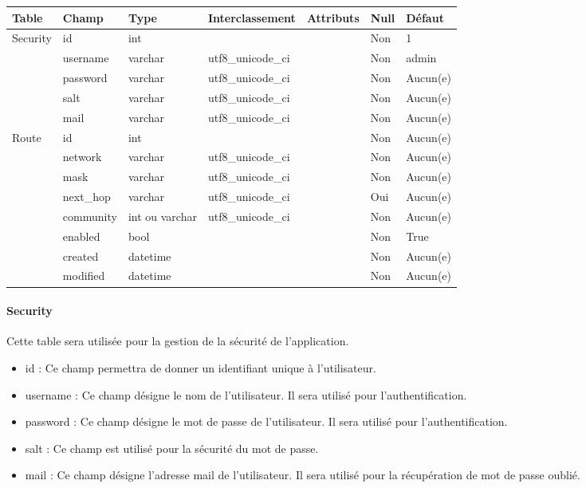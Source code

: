\begin{tabular}{|l|l|l|l|l|l|l|}
   \hline
    Table & Champ & Type & Interclassement & Attributs & Null & Défaut \\
    \hline
        Security & id & int &  &  & Non & 1 \\
    \cline{2-7}
         & username & varchar & utf8\_unicode\_ci & & Non & admin \\
    \cline{2-7}
         & password & varchar & utf8\_unicode\_ci & & Non & Aucun(e) \\
    \cline{2-7}
         & salt & varchar & utf8\_unicode\_ci & & Non & Aucun(e) \\
    \cline{2-7}
         & mail & varchar & utf8\_unicode\_ci & & Non & Aucun(e) \\
    \hline
        Route & id & int &  &  & Non & Aucun(e)\\
    \cline{2-7}
         & network & varchar & utf8\_unicode\_ci & & Non & Aucun(e) \\
    \cline{2-7}
         & mask & varchar & utf8\_unicode\_ci & & Non & Aucun(e) \\
    \cline{2-7}
         & next\_hop & varchar & utf8\_unicode\_ci & & Oui & Aucun(e) \\
    \cline{2-7}
         & community & int ou varchar & utf8\_unicode\_ci & & Non & Aucun(e) \\
    \cline{2-7}
         & enabled & bool &  & & Non & True \\
    \cline{2-7}
         & created & datetime &  & & Non & Aucun(e) \\
    \cline{2-7}
         & modified & datetime &  & & Non & Aucun(e) \\
    \hline
\end{tabular}

\paragraph{Security} Cette table sera utilisée pour la gestion de la sécurité de l'application.
\begin{itemize}
    \item id : Ce champ permettra de donner un identifiant unique à l'utilisateur.
    \item username : Ce champ désigne le nom de l'utilisateur. Il sera utilisé pour l'authentification.
    \item password : Ce champ désigne le mot de passe de l'utilisateur. Il sera utilisé pour l'authentification.
    \item salt : Ce champ est utilisé pour la sécurité du mot de passe.
    \item mail : Ce champ désigne l'adresse mail de l'utilisateur. Il sera utilisé pour la récupération de mot de passe oublié.
\end{itemize}


